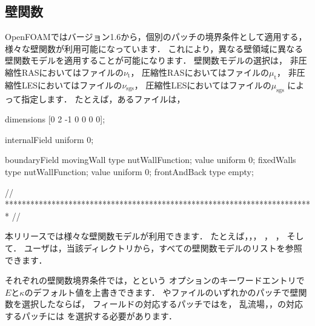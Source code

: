 \subsection{壁関数}
\label{ssec:7.2.2}
OpenFOAMではバージョン1.6から，個別のパッチの境界条件として適用する，
様々な壁関数が利用可能になっています．
これにより，異なる壁領域に異なる壁関数モデルを適用することが可能になります．
壁関数モデルの選択は，
非圧縮性RASにおいてはファイルの$\nu_{\mathrm{t}}$，
圧縮性RASにおいてはファイルの$\mu_{\mathrm{t}}$，
非圧縮性LESにおいてはファイルの$\nu_{\mathrm{sgs}}$，
圧縮性LESにおいてはファイルの$\mu_{\mathrm{sgs}}$
によって指定します．
たとえば，あるファイルは，
\begin{OFverbatim}[file, linenum=17]

dimensions      [0 2 -1 0 0 0 0];

internalField   uniform 0;

boundaryField
{
    movingWall
    {
        type            nutWallFunction;
        value           uniform 0;
    }
    fixedWalls
    {
        type            nutWallFunction;
        value           uniform 0;
    }
    frontAndBack
    {
        type            empty;
    }
}


// ************************************************************************* //
\end{OFverbatim}
本リリースでは様々な壁関数モデルが利用できます．
たとえば，，，
，
，
そして．
ユーザは，当該ディレクトリから，すべての壁関数モデルのリストを参照できます．

それぞれの壁関数境界条件では，とという
オプションのキーワードエントリで$E$と$\kappa$のデフォルト値を上書きできます．
やファイルのいずれかのパッチで壁関数を選択したならば，
フィールドの対応するパッチではを，
乱流場，，の対応するパッチには
を選択する必要があります．


